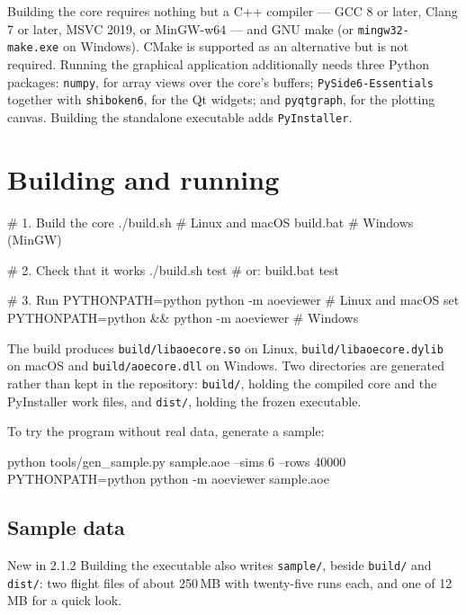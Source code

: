 \documentclass[11pt,a4paper,oneside]{report}
\newcommand{\appver}{2.1.2}
\newcommand{\code}[1]{\texttt{#1}}
\begin{document}
Building the core requires nothing but a C++ compiler --- GCC 8 or later, Clang
7 or later, MSVC 2019, or MinGW-w64 --- and GNU make (or
\code{mingw32-make.exe} on Windows). CMake is supported as an alternative but
is not required. Running the graphical application additionally needs three
Python packages: \code{numpy}, for array views over the core's buffers;
\code{PySide6-Essentials} together with \code{shiboken6}, for the Qt widgets;
and \code{pyqtgraph}, for the plotting canvas. Building the standalone
executable adds \code{PyInstaller}.

\section{Building and running}

\begin{aoecode}
# 1. Build the core
./build.sh                  # Linux and macOS
build.bat                   # Windows (MinGW)

# 2. Check that it works
./build.sh test             # or: build.bat test

# 3. Run
PYTHONPATH=python python -m aoeviewer                # Linux and macOS
set PYTHONPATH=python && python -m aoeviewer         # Windows
\end{aoecode}

The build produces \code{build/libaoecore.so} on Linux,
\code{build/libaoecore.dylib} on macOS and \code{build/aoecore.dll} on
Windows. Two directories are generated rather than kept in the repository:
\code{build/}, holding the compiled core and the PyInstaller work files, and
\code{dist/}, holding the frozen executable.

To try the program without real data, generate a sample:

\begin{aoecode}
python tools/gen_sample.py sample.aoe --sims 6 --rows 40000
PYTHONPATH=python python -m aoeviewer sample.aoe
\end{aoecode}

\subsection{Sample data}
\label{sec:samples}

\begin{aoenew}{New in \appver}
Building the executable also writes \code{sample/}, beside \code{build/} and
\code{dist/}: two flight files of about 250\,MB with twenty-five runs each, and
one of 12\,MB for a quick look.
\end{aoenew}
\end{document}
